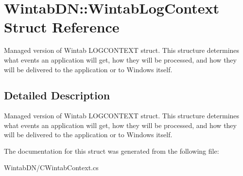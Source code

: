 \hypertarget{struct_wintab_d_n_1_1_wintab_log_context}{
\section{WintabDN::WintabLogContext Struct Reference}
\label{struct_wintab_d_n_1_1_wintab_log_context}
}


Managed version of Wintab LOGCONTEXT struct. This structure determines what events an application will get, how they will be processed, and how they will be delivered to the application or to Windows itself.  




\subsection{Detailed Description}
Managed version of Wintab LOGCONTEXT struct. This structure determines what events an application will get, how they will be processed, and how they will be delivered to the application or to Windows itself. 

The documentation for this struct was generated from the following file:\begin{DoxyCompactItemize}
\item 
WintabDN/CWintabContext.cs\end{DoxyCompactItemize}
